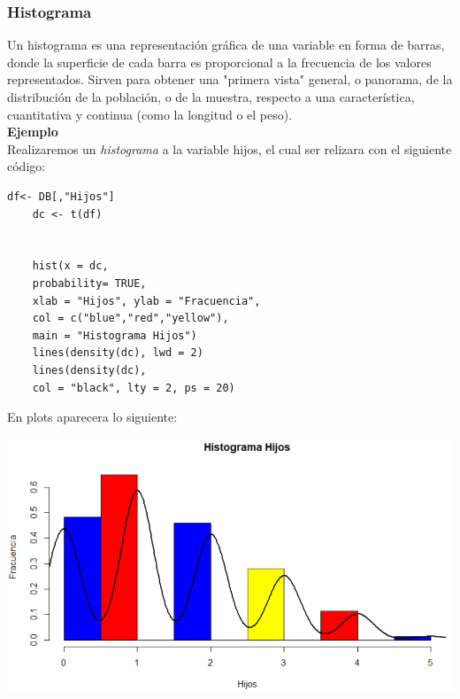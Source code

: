 \documentclass[12pt,hidelinks]{article}
\begin{document}
	\subsubsection{Histograma}
	Un histograma es una representación gráfica de una variable en forma de barras, donde la superficie de cada barra es proporcional a la frecuencia de los valores representados. Sirven para obtener una "primera vista" general, o panorama, de la distribución de la población, o de la muestra, respecto a una característica, cuantitativa y continua (como la longitud o el peso).\\
	\textbf{Ejemplo}\\
	Realizaremos un \textit{histograma} a la variable hijos, el cual ser relizara con el siguiente código:
	\begin{lstlisting}[frame=single]
	df<- DB[,"Hijos"]
	dc <- t(df)
	
	
	hist(x = dc,
	probability= TRUE,
	xlab = "Hijos", ylab = "Fracuencia",
	col = c("blue","red","yellow"),
	main = "Histograma Hijos")
	lines(density(dc), lwd = 2)
	lines(density(dc),
	col = "black", lty = 2, ps = 20)
	\end{lstlisting}
	En plots aparecera lo siguiente:
	\begin{center}
		\includegraphics[width = 14cm]{GraficaHisto.PNG}
	\end{center}
\end{document}
